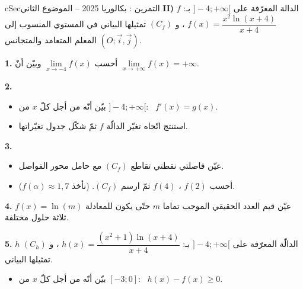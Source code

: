 \documentclass[12pt,a4paper]{article}
\newenvironment{BOX}[2]{\begin{otherlanguage}{english}\begin{arbox}{#1}{#2}}{\end{arbox}\end{otherlanguage}}
\newcounter{exo}
\newenvironment{tamrin}[1]{\stepcounter{exo}\begin{BOX}{cSec}{التمرين \theexo: #1}}{\end{BOX}}
\newenvironment{sq}{\begin{itemize}[leftmargin=2.4em,itemsep=3pt]}{\end{itemize}}
\newcommand{\qa}{\item[(أ)]}\newcommand{\qb}{\item[(ب)]}\newcommand{\qc}{\item[(جـ)]}\newcommand{\qd}{\item[(د)]}\newcommand{\qe}{\item[(هـ)]}
\newcommand{\QQ}[1]{\par\smallskip\textbf{#1.} }
\begin{document}
\begin{tamrin}{بكالوريا 2025 -- الموضوع الثاني}
\textbf{II)} $f$ الدالة المعرّفة على $]-4;+\infty[$ بـ: \ $f(x)=\dfrac{x^2\ln(x+4)}{x+4}$ ، و $(C_f)$ تمثيلها البياني في المستوي المنسوب إلى المعلم المتعامد والمتجانس $(O;\vec i,\vec j)$.
\QQ{1} أحسب $\lim\limits_{x\to-4}f(x)$ وبيّن أنّ $\lim\limits_{x\to+\infty}f(x)=+\infty$.
\QQ{2}
\begin{sq}
\qa بيّن أنّه من أجل كلّ $x$ من $]-4;+\infty[$: \ $f'(x)=g(x)$.
\qb استنتج اتّجاه تغيّر الدالّة $f$ ثمّ شكّل جدول تغيّراتها.
\end{sq}
\QQ{3}
\begin{sq}
\qa عيّن فاصلتي نقطتي تقاطع $(C_f)$ مع حامل محور الفواصل.
\qb أحسب $f(2)$ ، $f(4)$ ثمّ ارسم $(C_f)$. (نأخذ $f(\alpha)\approx1{,}7$).
\end{sq}
\QQ{4} عيّن قيم العدد الحقيقي الموجب تماما $m$ حتّى يكون للمعادلة $f(x)=\ln(m)$ ثلاثة حلول مختلفة.
\QQ{5} $h$ الدالّة المعرّفة على $]-4;+\infty[$ بـ: $h(x)=\dfrac{(x^2+1)\ln(x+4)}{x+4}$ ، و $(C_h)$ تمثيلها البياني.
\begin{sq}
\qa بيّن أنّه من أجل كلّ $x$ من $[-3;0]$: \ $h(x)-f(x)\geqslant0$.
\end{sq}
\end{tamrin}
\end{document}
